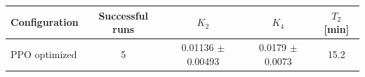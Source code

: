 \begin{tabular}{lcccc}
\toprule
Configuration & Successful runs & $K_2$ & $K_4$ & $T_2$ [min] \\
\midrule
PPO optimized & 5 & 0.01136 $\pm$ 0.00493 & 0.0179 $\pm$ 0.0073 & 15.2 \\
\bottomrule
\end{tabular}
